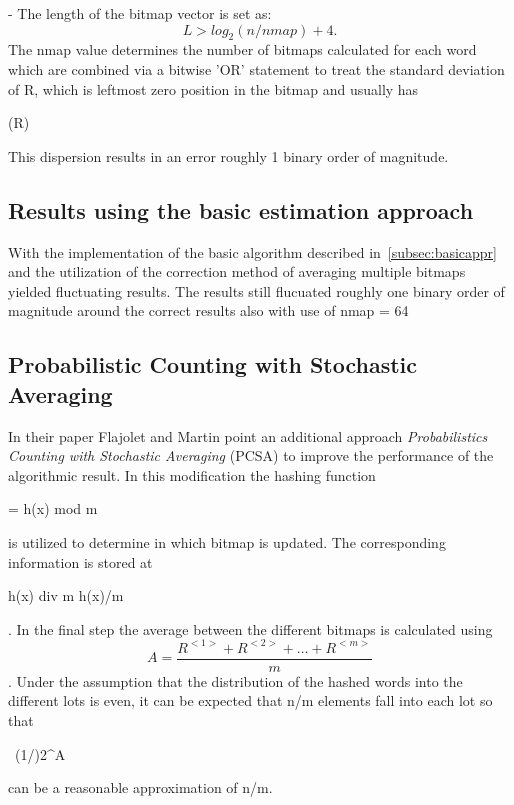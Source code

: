 \documentclass[11pt]{article}
\begin{document}
- The length of the bitmap vector is set as:
\begin{equation}
  L > log_2(n/nmap) + 4.
\end{equation}
The nmap value determines the number of bitmaps calculated for each word which are combined via a bitwise 'OR' statement to treat the standard deviation of R, which is leftmost zero position in the bitmap and usually has
\begin{definition}
  \sigma(R) 
\end{definition}
This dispersion results in an error roughly 1 binary order of magnitude.

\subsection{Results using the basic estimation approach}
With the implementation of the basic algorithm described in~\ref{subsec:basicappr} and the utilization of the correction method of averaging multiple bitmaps yielded fluctuating results.
The results still flucuated roughly one binary order of magnitude around the correct results also with use of nmap = 64

\subsection{Probabilistic Counting with Stochastic Averaging}
In their paper \cite{bib:fm85} Flajolet and Martin point an additional approach \emph{Probabilistics Counting with Stochastic Averaging} (PCSA) to improve the performance of the algorithmic result. In this modification the hashing function
\begin{definition}
  \alpha = h(x) mod m
\end{definition}
is utilized to determine in which bitmap is updated. The corresponding information is stored at
\begin{definition}
  h(x) div m \equiv \floor h(x)/m \floor
\end{definition}. In the final step the average between the different bitmaps is calculated using
\begin{equation}
  A = \frac{ R^{<1>} + R^{<2>} + \dots + R^{<m>}}m
\end{equation}.
Under the assumption that the distribution of the hashed words into the different lots is even, it can be expected that n/m elements fall into each lot so that
\begin{definition}
  \ (1/\varphi)2^A
\end{definition}
can be a reasonable approximation of n/m.
\end{document}
